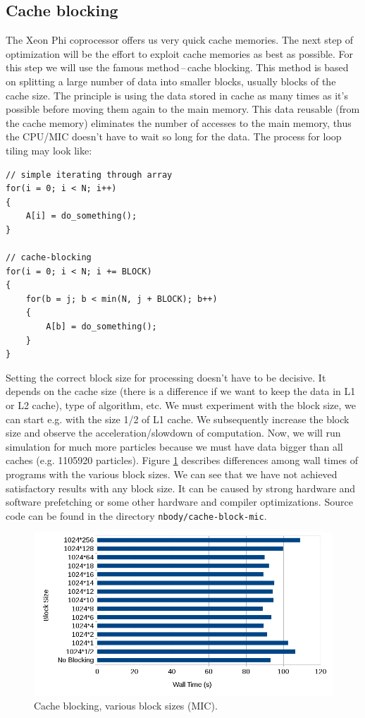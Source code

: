 \subsection{Cache blocking}
The Xeon Phi coprocessor offers us very quick cache memories. The next step of optimization will be the effort to exploit cache memories as best as possible. For this step we will use the famous method\,--\,cache blocking. This method is based on splitting a large number of data into smaller blocks, usually blocks of the cache size. The principle is using the data stored in cache as many times as it's possible before moving them again to the main memory. This data reusable (from the cache memory) eliminates the number of accesses to the main memory, thus the CPU/MIC doesn't have to wait so long for the data. The process for loop tiling may look like:

\bigskip
\begin{lstlisting}[caption=Pseudo code of the cache-blocking., captionpos=b, label=code_nbody_algorithm]
// simple iterating through array
for(i = 0; i < N; i++)
{
    A[i] = do_something();
}

// cache-blocking
for(i = 0; i < N; i += BLOCK)
{
    for(b = j; b < min(N, j + BLOCK); b++)
    {
        A[b] = do_something();
    }
}
\end{lstlisting}
\bigskip

Setting the correct block size for processing doesn't have to be decisive. It depends on the cache size (there is a difference if we want to keep the data in L1 or L2 cache), type of algorithm, etc. We must experiment with the block size, we can start e.g. with the size 1/2 of L1 cache. We subsequently increase the block size and observe the acceleration/slowdown of computation. Now, we will run simulation for much more particles because we must have data bigger than all caches (e.g. 1105920 particles). Figure \ref{fig:graph_nbody_blocking} describes differences among wall times of programs with the various block sizes. We can see that we have not achieved satisfactory results with any block size. It can be caused by strong hardware and software prefetching or some other hardware and compiler optimizations. Source code can be found in the directory \texttt{nbody/cache-block-mic}.

\begin{figure}[htbp]
    \centering
    \includegraphics[width=1\linewidth]{fig/nbody_blocking.png}
    \caption{Cache blocking, various block sizes (MIC).}
    \label{fig:graph_nbody_blocking}
\end{figure} 

